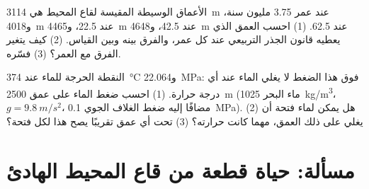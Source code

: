 \begin{exercise}[$\star\star\star$]\label{exo:g11:ocean-ridges:14}
الأعماق الوسيطة المقيسة لقاع المحيط هي \qty{3114}{m} عند عمر
\num{3.75} مليون سنة، و\qty{4018}{m} عند \num{22.5}، و\qty{4465}{m} عند
\num{42.5}، و\qty{4648}{m} عند \num{62.5}. (1) احسب العمق الذي يعطيه
قانون الجذر التربيعي عند كل عمر، والفرق بينه وبين القياس. (2)
كيف يتغير الفرق مع العمر؟ (3) فسّره.
\end{exercise}

\begin{exercise}[$\star\star\star$]\label{exo:g11:ocean-ridges:15}
النقطة الحرجة للماء عند \qty{374}{\celsius} و\qty{22.064}{MPa}: فوق
هذا الضغط لا يغلي الماء عند أي درجة حرارة. (1) احسب
ضغط الماء على عمق \qty{2500}{m} (ماء البحر \qty{1025}{kg/m^3}،
$g = \qty{9.8}{m/s^2}$، مضافًا إليه ضغط الغلاف الجوي \qty{0.1}{MPa}). (2) هل يمكن
لماء فتحة أن يغلي على ذلك العمق، مهما كانت حرارته؟ (3) تحت أي عمق تقريبًا
يصح هذا لكل فتحة؟
\end{exercise}

\section{مسألة: حياة قطعة من قاع المحيط الهادئ}

